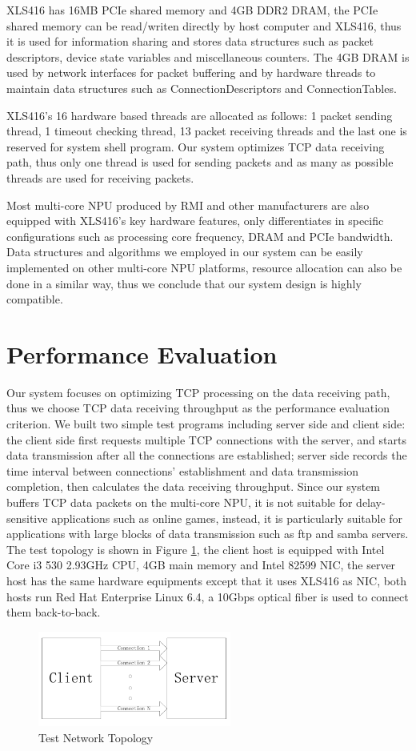 \documentclass[conference]{IEEEtran}
\begin{document}
XLS416 has 16MB PCIe shared memory and 4GB DDR2 DRAM, the PCIe shared memory can be read/writen directly by host computer and XLS416, thus it is used for information sharing and stores data structures such as packet descriptors, device state variables and miscellaneous counters. The 4GB DRAM is used by network interfaces for packet buffering and by hardware threads to maintain data structures such as ConnectionDescriptors and ConnectionTables.

XLS416's 16 hardware based threads are allocated as follows: 1 packet sending thread, 1 timeout checking thread, 13 packet receiving threads and the last one is reserved for system shell program. Our system optimizes TCP data receiving path, thus only one thread is used for sending packets and as many as possible threads are used for receiving packets.

Most multi-core NPU produced by RMI and other manufacturers are also equipped with XLS416's key hardware features, only differentiates in specific configurations such as processing core frequency, DRAM and PCIe bandwidth. Data structures and algorithms we employed in our system can be easily implemented on other multi-core NPU platforms, resource allocation can also be done in a similar way, thus we conclude that our system design is highly compatible.
\section{Performance Evaluation}
Our system focuses on optimizing TCP processing on the data receiving path, thus we choose TCP data receiving throughput as the performance evaluation criterion. We built two simple test programs including server side and client side: the client side first requests multiple TCP connections with the server, and starts data transmission after all the connections are established; server side records the time interval between connections' establishment and data transmission completion, then calculates the data receiving throughput. Since our system buffers TCP data packets on the multi-core NPU, it is not suitable for delay-sensitive applications such as online games, instead, it is particularly suitable for applications with large blocks of data transmission such as ftp and samba servers. The test topology is shown in Figure \ref{test_topology}, the client host is equipped with Intel Core i3 530 2.93GHz CPU, 4GB main memory and Intel 82599 NIC, the server host has the same hardware equipments except that it uses XLS416 as NIC, both hosts run Red Hat Enterprise Linux 6.4, a 10Gbps optical fiber is used to connect them back-to-back.
\begin{figure}[!t]
\centering
\includegraphics[width=2.5in]{test_topology}
\caption{Test Network Topology}
\label{test_topology}
\end{figure}
\end{document}
